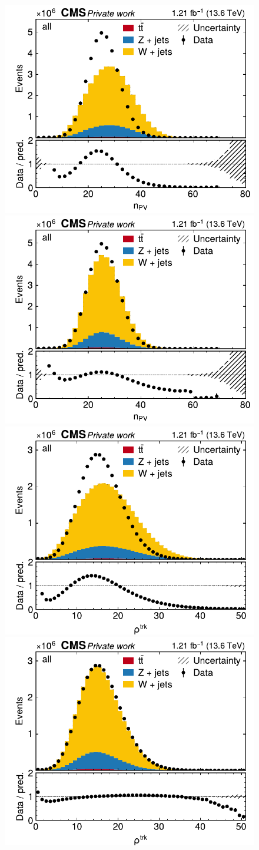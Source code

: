 \begin{figure}[p]
    \centering
    \includegraphics[width=0.49 \textwidth]{figures/ttxs/pileup/nvtx_orig.pdf}
    \hfill
    \includegraphics[width=0.49 \textwidth]{figures/ttxs/pileup/nvtx_reweighted.pdf}
    \includegraphics[width=0.49 \textwidth]{figures/ttxs/pileup/rhoFastjetCentralChargedPileUp_orig.pdf}
    \hfill
    \includegraphics[width=0.49 \textwidth]{figures/ttxs/pileup/rhoFastjetCentralChargedPileUp_reweighted.pdf}

\end{figure}
